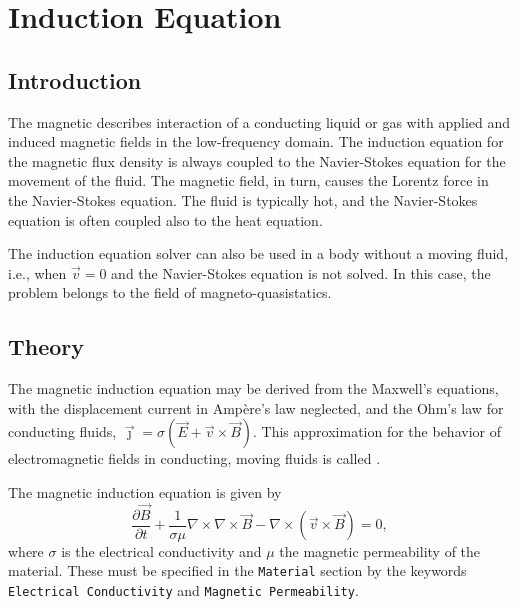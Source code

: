 \chapter{Induction Equation}
\noindent
{}
\begin{versiona}

\section{Introduction}

The magnetic  describes interaction of a conducting
liquid or gas with applied and induced magnetic fields in the low-frequency
domain. The induction equation for the magnetic flux density is always coupled
to the Navier-Stokes equation for the movement of the fluid. The magnetic
field, in turn, causes the Lorentz force in the Navier-Stokes equation. The
fluid is typically hot, and the Navier-Stokes equation is often coupled also
to the heat equation.

The induction equation solver can also be used in a body without a moving
fluid, i.e., when $\vec{v}=0$ and the Navier-Stokes equation is not solved.
In this case, the problem belongs to the field of magneto-quasistatics.

\section{Theory}

The magnetic induction equation may be derived from the Maxwell's equations,
with the displacement current in Amp\`{e}re's law neglected, and the Ohm's law
for conducting fluids,
$\vec{\jmath} = \sigma ( \vec{E} + \vec{v}\times\vec{B} )$. This approximation
for the behavior of electromagnetic
fields in conducting, moving fluids is called .

The magnetic induction equation is given by
\begin{equation}
\frac{\partial \vec{B}}{\partial t} + \frac{1}{\sigma\mu}\nabla\times\nabla\times \vec{B} - 
\nabla\times(\vec{v}\times \vec{B}) = 0,\label{induction}
\end{equation}
where $\sigma$ is the electrical conductivity and
$\mu$ the magnetic permeability of the material. These must be specified in the
{\tt Material} section by the
keywords {\tt Electrical Conductivity} and {\tt Magnetic Permeability}.


\end{versiona}

